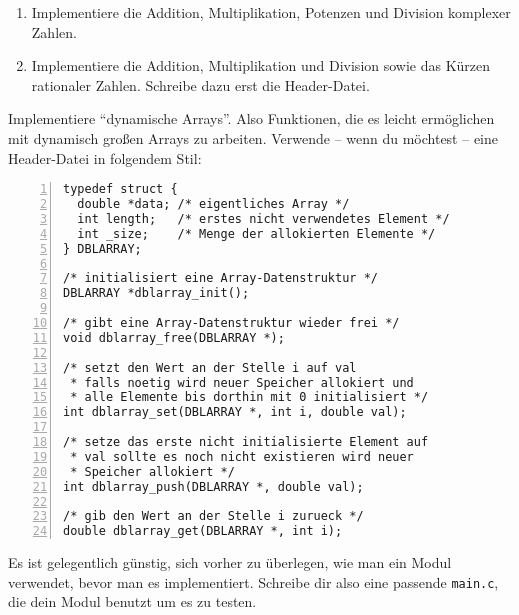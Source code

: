 \documentclass{uebungszettel}
\begin{document}
\begin{aufg}
\begin{enumerate}
\item Implementiere die Addition, Multiplikation, Potenzen und Division komplexer Zahlen. 
\item Implementiere die Addition, Multiplikation und Division sowie das Kürzen rationaler Zahlen. Schreibe dazu erst die Header-Datei.
\end{enumerate}
\end{aufg}


\begin{aufg}
Implementiere "`dynamische Arrays"'. Also Funktionen, die es leicht ermöglichen mit dynamisch großen Arrays zu arbeiten. Verwende -- wenn du möchtest -- eine Header-Datei in folgendem Stil:
\begin{codelisting}
\begin{lstlisting}[numbers=left,numberstyle=\tiny,frame=tlrb]
typedef struct {
  double *data; /* eigentliches Array */
  int length;   /* erstes nicht verwendetes Element */
  int _size;    /* Menge der allokierten Elemente */
} DBLARRAY;

/* initialisiert eine Array-Datenstruktur */
DBLARRAY *dblarray_init();

/* gibt eine Array-Datenstruktur wieder frei */
void dblarray_free(DBLARRAY *);

/* setzt den Wert an der Stelle i auf val 
 * falls noetig wird neuer Speicher allokiert und 
 * alle Elemente bis dorthin mit 0 initialisiert */
int dblarray_set(DBLARRAY *, int i, double val);

/* setze das erste nicht initialisierte Element auf 
 * val sollte es noch nicht existieren wird neuer 
 * Speicher allokiert */
int dblarray_push(DBLARRAY *, double val);

/* gib den Wert an der Stelle i zurueck */
double dblarray_get(DBLARRAY *, int i);

\end{lstlisting}
\end{codelisting}
Es ist gelegentlich günstig, sich vorher zu überlegen, wie man ein Modul verwendet, bevor man es implementiert. Schreibe dir also eine passende \verb|main.c|, die dein Modul benutzt um es zu testen.
\end{aufg}

\newpage
\end{document}
